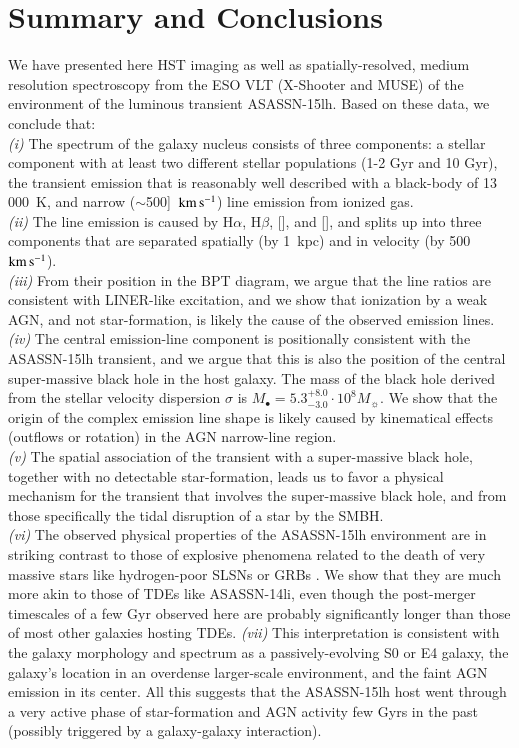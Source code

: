 \documentclass[traditabstract]{aa}
\newcommand{\kms}{$\rm{km\,s^{-1}}$}
\newcommand{\hb}{H$\beta$}
\newcommand{\ha}{H$\alpha$}
\newcommand{\oiii}{[\ion{O}{iii}]}
\newcommand{\nii}{[\ion{N}{ii}]}
\begin{document}
\section{Summary and Conclusions}

We have presented here HST imaging as well as spatially-resolved, medium resolution spectroscopy from the ESO VLT (X-Shooter and MUSE) of the environment of the luminous transient ASASSN-15lh. Based on these data, we conclude that:\\
\emph{(i)} The spectrum of the galaxy nucleus consists of three components: a stellar component with at least two different stellar populations (1-2 Gyr and 10 Gyr), the transient emission that is reasonably well described with a black-body of 13\,000~K, and narrow ($\sim$500]~\kms) line emission from ionized gas.\\
\textit{(ii)} The line emission is caused by \ha, \hb, \nii, and \oiii, and splits up into three components that are separated spatially (by 1~kpc) and in velocity (by 500~\kms). \\
\textit{(iii)} From their position in the BPT diagram, we argue that the line ratios are consistent with LINER-like excitation, and we show that ionization by a weak AGN, and not star-formation, is likely the cause of the observed emission lines.\\
\textit{(iv)} The central emission-line component is positionally consistent with the ASASSN-15lh transient, and we argue that this is also the position of the central super-massive black hole in the host galaxy. The mass of the black hole derived from the stellar velocity dispersion $\sigma$ is $M_\bullet = 5.3_{-3.0}^{+8.0}\cdot10^{8} M_\sun$. We show that the origin of the complex emission line shape is likely caused by kinematical effects (outflows or rotation) in the AGN narrow-line region.\\
\textit{(v)} The spatial association of the transient with a super-massive black hole, together with no detectable star-formation, leads us to favor a physical mechanism for the transient that involves the super-massive black hole, and from those specifically the tidal disruption of a star by the SMBH.\\
\textit{(vi)} The observed physical properties of the ASASSN-15lh environment are in striking contrast to those of explosive phenomena related to the death of very massive stars like hydrogen-poor SLSNs \citep[e.g.,][]{2014ApJ...787..138L, 2016arXiv161205978S} or GRBs \citep[e.g.,][]{2015A&A...581A.125K, 2017MNRAS.467.1795L}. We show that they are much more akin to those of TDEs like ASASSN-14li, even though the post-merger timescales of a few Gyr observed here are probably significantly longer than those of most other galaxies hosting TDEs.
\textit{(vii)} This interpretation is consistent with the galaxy morphology and spectrum as a passively-evolving S0 or E4 galaxy, the galaxy's location in an overdense larger-scale environment, and the faint AGN emission in its center. All this suggests that the ASASSN-15lh host went through a very active phase of star-formation and AGN activity few Gyrs in the past (possibly triggered by a galaxy-galaxy interaction). \\
\end{document}
